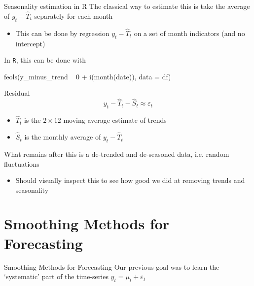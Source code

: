 \documentclass[aspectratio=169,t,11pt,table]{beamer}
\begin{document}
\begin{frame}[fragile]{Seasonality estimation in R}
  The classical way to estimate this is take the average of $y_t - \hat{T}_t$ separately for each month
  \begin{itemize}
    \item This can be done by regression $y_t - \hat{T}_t$ on a set of month indicators (and no intercept)
  \end{itemize}

  \bigskip
  In \texttt{R}, this can be done with 
  \begin{codeblock}
feols(y_minus_trend ~ 0 + i(month(date)), data = df)
  \end{codeblock}
\end{frame}


\begin{frame}{Residual}
  \vspace*{-\bigskipamount}
  $$
    y_t - \hat{T}_t - \hat{S}_t \approx \varepsilon_t
  $$
  \begin{itemize}
    \item $\hat{T}_t$ is the $2 \times 12$ moving average estimate of trends
    
    \item $\hat{S}_t$ is the monthly average of $y_t - \hat{T}_t$
  \end{itemize}

  \bigskip
  What remains after this is a de-trended and de-seasoned data, i.e. random fluctuations
  \begin{itemize}
    \item Should visually inspect this to see how good we did at removing trends and seasonality
  \end{itemize}
\end{frame}



\section{Smoothing Methods for Forecasting}

\begin{frame}{Smoothing Methods for Forecasting}
  Our previous goal was to learn the `systematic' part of the time-series $y_t = \mu_t + \varepsilon_t$
\end{frame}
\end{document}
